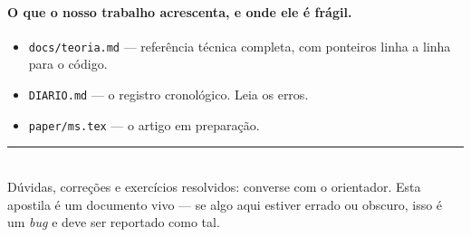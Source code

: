 \documentclass[11pt,a4paper]{article}
\newcommand{\code}[1]{\texttt{\small #1}}
\newcounter{exerc}[section]
\begin{document}
\paragraph{O que o nosso trabalho acrescenta, e onde ele é frágil.}
\begin{itemize}[leftmargin=1.2em]
\item \code{docs/teoria.md} --- referência técnica completa, com ponteiros
      linha a linha para o código.
\item \code{DIARIO.md} --- o registro cronológico. Leia os erros.
\item \code{paper/ms.tex} --- o artigo em preparação.
\end{itemize}

\vfill
\noindent\rule{\textwidth}{0.4pt}\\
{\small Dúvidas, correções e exercícios resolvidos: converse com o
orientador. Esta apostila é um documento vivo --- se algo aqui estiver errado
ou obscuro, isso é um \emph{bug} e deve ser reportado como tal.}
\end{document}
